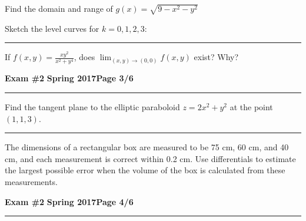 \documentclass[12pt]{article}
\theoremstyle{definition}
\begin{document}
\bigskip
{\problem[15 pts] Find the domain and range of
$g(x)=\sqrt{9-x^2-y^2}$}
\vspace{2.5cm}
\begin{flushright}
\end{flushright}
Sketch the level curves for $k=0,1,2,3$:
\vspace{8cm}
\hrule
{\problem[15 pts] If $f(x,y)=\displaystyle{\frac{xy^2}{x^2+y^4}}$, does
$\displaystyle{\lim_{(x,y)\to(0,0)} f(x,y)}$ exist?  Why?
\newpage

\hfill{\large\bf Exam \#2}\hfill{\large\bf
  Spring 2017}\hfill{\large\bf Page 3/6}\hrule

\bigskip
{\problem[15 pts] Find the tangent plane to the elliptic paraboloid
$z=2x^2+y^2$ at the point $(1,1,3)$.}
\vspace{9.5cm}
\begin{flushright}
\end{flushright}
\hrule
{\problem[10 pts] The dimensions of a rectangular box are measured
to be 75 cm, 60 cm, and 40 cm, and each measurement is correct within
0.2 cm.  Use differentials to estimate the largest possible error when
the volume of the box is calculated from these measurements.}
\vspace{7.5cm}
\begin{flushright}
\end{flushright}
\newpage

\hfill{\large\bf Exam \#2}\hfill{\large\bf
  Spring 2017}\hfill{\large\bf Page 4/6}\hrule

}
\end{document}
